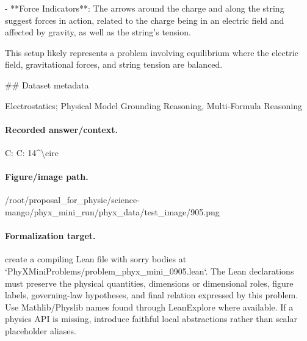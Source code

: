 - **Force Indicators**: The arrows around the charge and along the string suggest forces in action, related to the charge being in an electric field and affected by gravity, as well as the string's tension.

This setup likely represents a problem involving equilibrium where the electric field, gravitational forces, and string tension are balanced.

\#\# Dataset metadata

Electrostatics; Physical Model Grounding Reasoning, Multi-Formula Reasoning

\paragraph{Recorded answer/context.}
C: C: 14\textasciicircum{}\textbackslash{}circ

\paragraph{Figure/image path.}
/root/proposal\_for\_physic/science-mango/phyx\_mini\_run/phyx\_data/test\_image/905.png

\paragraph{Formalization target.}
create a compiling Lean file with sorry bodies at `PhyXMiniProblems/problem\_phyx\_mini\_0905.lean`. The Lean declarations must preserve the physical quantities, dimensions or dimensional roles, figure labels, governing-law hypotheses, and final relation expressed by this problem.
Use Mathlib/Physlib names found through LeanExplore where available. If a physics API is missing, introduce faithful local abstractions rather than scalar placeholder aliases.

